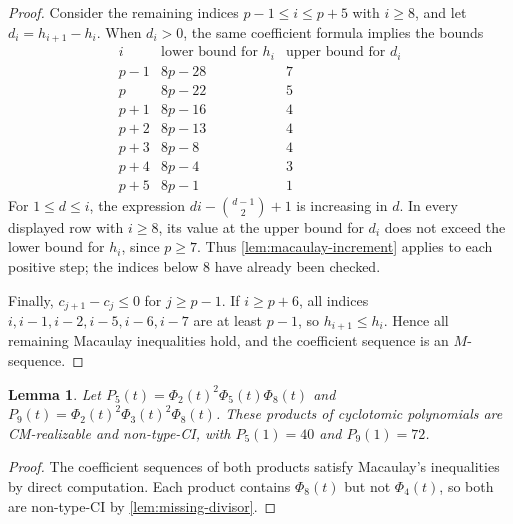 \documentclass[11pt,a4paper]{amsart}
\newtheorem{lemma}[lemma]{Lemma}
\theoremstyle{definition}
\theoremstyle{remark}
\begin{document}
\begin{proof}
Consider the remaining indices $p-1\le i\le p+5$ with $i\ge8$, and let $d_i=h_{i+1}-h_i$. When $d_i>0$, the same coefficient formula implies the bounds
\[\begin{array}{c|cc}
i&\text{lower bound for }h_i&\text{upper bound for }d_i\\\hline
p-1&8p-28&7\\
p&8p-22&5\\
p+1&8p-16&4\\
p+2&8p-13&4\\
p+3&8p-8&4\\
p+4&8p-4&3\\
p+5&8p-1&1
\end{array}\]
For $1\le d\le i$, the expression $di-\binom{d-1}{2}+1$ is increasing in $d$. In every displayed row with $i\ge8$, its value at the upper bound for $d_i$ does not exceed the lower bound for $h_i$, since $p\ge7$. Thus \cref{lem:macaulay-increment} applies to each positive step; the indices below $8$ have already been checked.

Finally, $c_{j+1}-c_j\le0$ for $j\ge p-1$. If $i\ge p+6$, all indices $i,i-1,i-2,i-5,i-6,i-7$ are at least $p-1$, so $h_{i+1}\le h_i$. Hence all remaining Macaulay inequalities hold, and the coefficient sequence is an $M$-sequence.
\end{proof}

\begin{lemma}\label{lem:P5-P9}
Let $P_5(t)=\Phi_2(t)^2\Phi_5(t)\Phi_8(t)$ and $P_9(t)=\Phi_2(t)^2\Phi_3(t)^2\Phi_8(t)$. These products of cyclotomic polynomials are CM-realizable and non-type-CI, with $P_5(1)=40$ and $P_9(1)=72$.
\end{lemma}
\begin{proof}
The coefficient sequences of both products satisfy Macaulay's inequalities by direct computation. Each product contains $\Phi_8(t)$ but not $\Phi_4(t)$, so both are non-type-CI by \cref{lem:missing-divisor}.
\end{proof}
\end{document}
